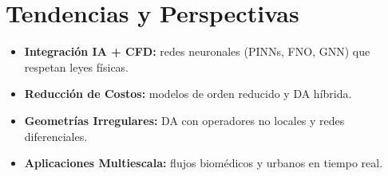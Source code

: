 \documentclass[12pt]{article}
\begin{document}
\section*{Tendencias y Perspectivas}

\begin{itemize}
  \item \textbf{Integración IA + CFD:} redes neuronales (PINNs, FNO, GNN) que respetan leyes físicas.
  \item \textbf{Reducción de Costos:} modelos de orden reducido y DA híbrida.
  \item \textbf{Geometrías Irregulares:} DA con operadores no locales y redes diferenciales.
  \item \textbf{Aplicaciones Multiescala:} flujos biomédicos y urbanos en tiempo real.
\end{itemize}
\end{document}
